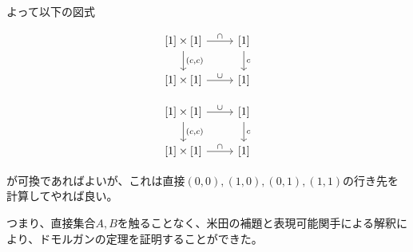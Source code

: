 \documentclass[uplatex]{jsarticle}
\begin{document}
よって以下の図式
\begin{multicols}{2}
\[
\begin{tikzcd}
{[1] \times [1]} \ar[r, "\cap"] \ar[d, "{(c, c)}"] & {[1]} \ar[d, "c"]\\
{[1] \times [1]} \ar[r, "\cup"] & {[1]}
\end{tikzcd}
\]

\[
\begin{tikzcd}
{[1] \times [1]} \ar[r, "\cup"] \ar[d, "{(c, c)}"] & {[1]} \ar[d, "c"]\\
{[1] \times [1]} \ar[r, "\cap"] & {[1]}
\end{tikzcd}
\]
\end{multicols}
が可換であればよいが、これは直接$(0,0), (1,0), (0,1), (1,1)$の行き先を計算してやれば良い。

つまり、直接集合$A, B$を触ることなく、米田の補題と表現可能関手による解釈により、ドモルガンの定理を証明することができた。
\end{document}
